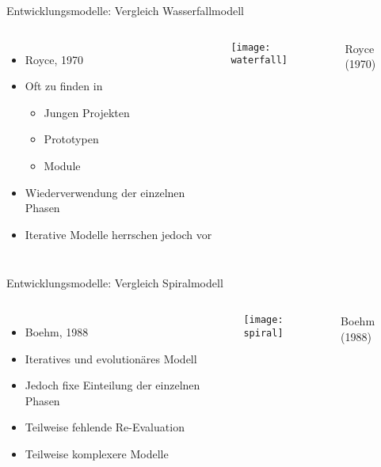 \documentclass[11pt]{beamer}
\newlength{\colwidth}
\begin{document}
\begin{frame}{Entwicklungsmodelle: Vergleich Wasserfallmodell}
  \begin{center}
  \begin{columns}[T]
  \column{\colwidth}
  \begin{itemize}
    \item Royce, 1970
    \item Oft zu finden in
    \begin{itemize}
      \item Jungen Projekten
      \item Prototypen
      \item Module
    \end{itemize}
    \item Wiederverwendung der einzelnen Phasen
    \item Iterative Modelle herrschen jedoch vor
  \end{itemize}
  \column{\colwidth}
  \texttt{[image: waterfall]}

  {\tiny\hfill
  Royce (1970)
  }

  \end{columns}
  \end{center}
\end{frame}

\begin{frame}{Entwicklungsmodelle: Vergleich Spiralmodell}
  \begin{center}
  \begin{columns}[T]
  \column{\colwidth}
  \begin{itemize}
    \item Boehm, 1988
    \item Iteratives und evolutionäres Modell
    \item Jedoch fixe Einteilung der einzelnen Phasen
    \item Teilweise fehlende Re-Evaluation
    \item Teilweise komplexere Modelle
  \end{itemize}
  \column{\colwidth}
  \texttt{[image: spiral]}

  {\tiny\hfill
  Boehm (1988)
  }

  \end{columns}
  \end{center}
\end{frame}
\end{document}
